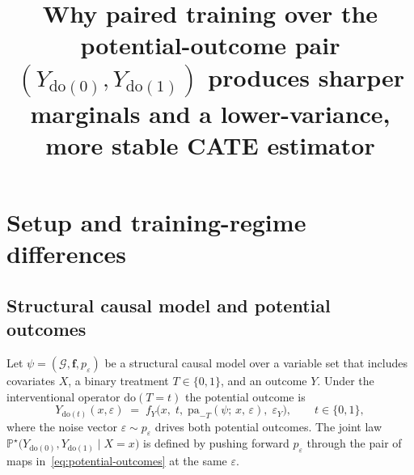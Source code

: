\documentclass[11pt]{article}
\title{Why paired training over the potential-outcome pair
       $(Y_{\mathrm{do}(0)}, Y_{\mathrm{do}(1)})$ produces sharper
       marginals and a lower-variance, more stable CATE estimator}
\author{}
\date{}
\theoremstyle{remark}
\newcommand{\PP}{\mathbb{P}}
\begin{document}
\maketitle


\section{Setup and training-regime differences}
\label{sec:setup}

\subsection{Structural causal model and potential outcomes}

Let $\psi = (\mathcal{G}, \mathbf{f}, p_\varepsilon)$ be a structural
causal model over a variable set that includes covariates $X$, a binary
treatment $T \in \{0,1\}$, and an outcome $Y$. Under the interventional
operator $\mathrm{do}(T=t)$ the potential outcome is
\begin{equation}
  Y_{\mathrm{do}(t)}(x, \varepsilon) \;=\;
  f_Y\!\bigl(x,\; t,\; \mathrm{pa}_{-T}(\psi;\,x,\,\varepsilon),\;
              \varepsilon_Y\bigr),
  \qquad t \in \{0,1\},
  \label{eq:potential-outcomes}
\end{equation}
where the noise vector $\varepsilon \sim p_\varepsilon$ drives both
potential outcomes. The joint
law $\PP^\star\!\bigl(Y_{\mathrm{do}(0)}, Y_{\mathrm{do}(1)} \mid X = x\bigr)$
is defined by pushing forward $p_\varepsilon$ through the pair of maps
in~\eqref{eq:potential-outcomes} at the same $\varepsilon$. 
\end{document}
